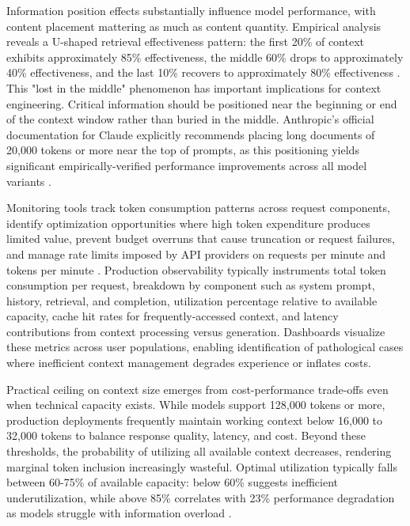 \documentclass[11pt,letterpaper]{article}
\begin{document}
Information position effects substantially influence model performance, with content placement mattering as much as content quantity. Empirical analysis reveals a U-shaped retrieval effectiveness pattern: the first 20\% of context exhibits approximately 85\% effectiveness, the middle 60\% drops to approximately 40\% effectiveness, and the last 10\% recovers to approximately 80\% effectiveness \cite{liu2024lost}. This "lost in the middle" phenomenon has important implications for context engineering. Critical information should be positioned near the beginning or end of the context window rather than buried in the middle. Anthropic's official documentation for Claude explicitly recommends placing long documents of 20,000 tokens or more near the top of prompts, as this positioning yields significant empirically-verified performance improvements across all model variants \cite{anthropic2024tips}.

Monitoring tools track token consumption patterns across request components, identify optimization opportunities where high token expenditure produces limited value, prevent budget overruns that cause truncation or request failures, and manage rate limits imposed by API providers on requests per minute and tokens per minute \cite{getmaxim2024context}. Production observability typically instruments total token consumption per request, breakdown by component such as system prompt, history, retrieval, and completion, utilization percentage relative to available capacity, cache hit rates for frequently-accessed context, and latency contributions from context processing versus generation. Dashboards visualize these metrics across user populations, enabling identification of pathological cases where inefficient context management degrades experience or inflates costs.

Practical ceiling on context size emerges from cost-performance trade-offs even when technical capacity exists. While models support 128,000 tokens or more, production deployments frequently maintain working context below 16,000 to 32,000 tokens to balance response quality, latency, and cost. Beyond these thresholds, the probability of utilizing all available context decreases, rendering marginal token inclusion increasingly wasteful. Optimal utilization typically falls between 60-75\% of available capacity: below 60\% suggests inefficient underutilization, while above 85\% correlates with 23\% performance degradation as models struggle with information overload \cite{anthropic2024budget}.
\end{document}
